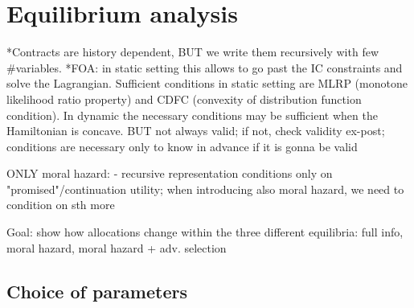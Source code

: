 \section{Equilibrium analysis}

*Contracts are history dependent, BUT we write them recursively with few \#variables.
*FOA: in static setting this allows to go past the IC constraints and solve the Lagrangian. Sufficient conditions in static setting are MLRP (monotone likelihood ratio property) and CDFC (convexity of distribution function condition). In dynamic the necessary conditions may be sufficient when the Hamiltonian is concave.
    BUT not always valid; if not, check validity ex-post; conditions are necessary only to know in advance if it is gonna be valid




ONLY moral hazard:
- recursive representation conditions only on "promised"/continuation utility; when introducing also moral hazard, we need to condition on sth more






Goal: show how allocations change within the three different equilibria: full info, moral hazard, moral hazard + adv. selection 





\subsection*{Choice of parameters}